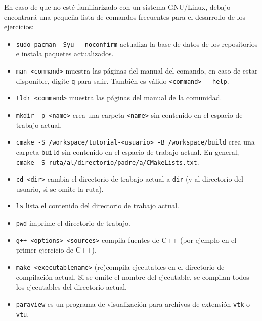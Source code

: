 \documentclass[9pt,a3paper]{scrartcl}
\begin{document}
En caso de que no esté familiarizado con un sistema GNU/Linux, debajo
encontrará una pequeña lista de comandos frecuentes para el
desarrollo de los ejercicios:
\begin{itemize}
	\item

	      \verb!sudo pacman -Syu --noconfirm! actualiza la base de
	      datos de los repositorios e instala paquetes actualizados.

	\item

	      \verb!man <command>! muestra las páginas del manual del
	      comando, en caso de estar disponible, digite \verb!q! para
	      salir.
	      También es válido \verb!<command> --help!.

	\item

	      \verb!tldr <command>! muestra las páginas del manual de la
	      comunidad.

	\item

	      \verb!mkdir -p <name>! crea una carpeta \verb!<name>! sin
	      contenido en el espacio de trabajo actual.

	\item

	      \verb!cmake -S /workspace/tutorial-<usuario> -B /workspace/build!
	      crea una carpeta
	      \verb!build! sin contenido en el espacio de trabajo actual.
	      En general, \verb!cmake -S ruta/al/directorio/padre/a/CMakeLists.txt!.

	\item

	      \verb!cd <dir>! cambia el directorio de trabajo actual
	      a \verb!dir! (y al directorio del usuario, si se omite la ruta).

	\item

	      \verb!ls! lista el contenido del directorio de trabajo actual.

	\item

	      \verb!pwd! imprime el directorio de trabajo.

	\item

	      \verb!g++ <options> <sources>! compila fuentes de C++
	      (por ejemplo en el primer ejercicio de C++).

	\item

	      \verb!make <executablename>! (re)compila ejecutables en el
	      directorio de compilación actual.
	      Si se omite el nombre del ejecutable, se compilan todos los
	      ejecutables del directorio actual.

	\item

	      \verb!paraview! es un programa de visualización para archivos
	      de extensión
	      \verb!vtk! o \verb!vtu!.
\end{itemize}
\end{document}

